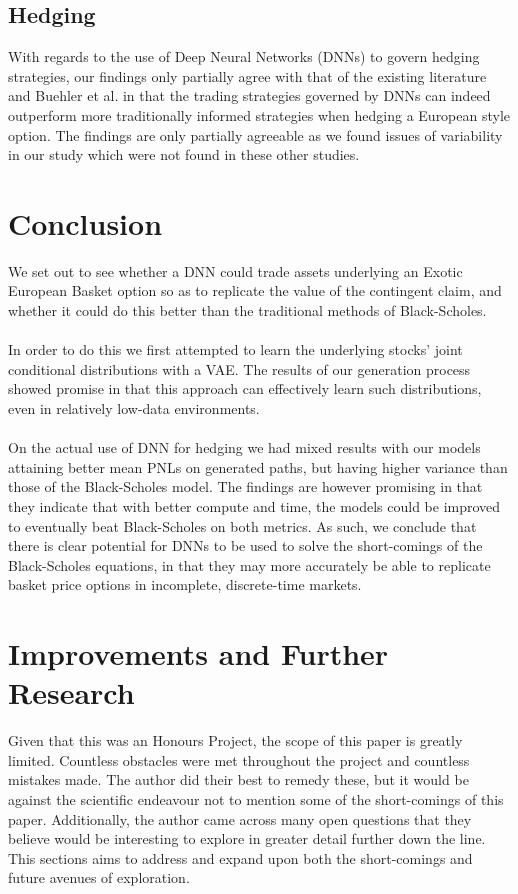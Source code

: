 \documentclass{article}
\theoremstyle{definition}
\begin{document}
\subsection{Hedging}
With regards to the use of Deep Neural Networks (DNNs) to govern hedging strategies, our findings only partially agree with that of the existing literature \cite{stangroom2023deephedging} and Buehler et al. \cite{buehler2019deep} in that the trading strategies governed by DNNs can indeed outperform more traditionally informed strategies when hedging a European style option. The findings are only partially agreeable as we found issues of variability in our study which were not found in these other studies.
\newpage

\section{Conclusion}
We set out to see whether a DNN could trade assets underlying an Exotic European Basket option so as to replicate the value of the contingent claim, and whether it could do this better than the traditional methods of Black-Scholes.\\\\
In order to do this we first attempted to learn the underlying stocks' joint conditional distributions with a VAE. The results of our generation process showed promise in that this approach can effectively learn such distributions, even in relatively low-data environments.
\\\\
On the actual use of DNN for hedging we had mixed results with our models attaining better mean PNLs on generated paths, but having higher variance than those of the Black-Scholes model. The findings are however promising in that they indicate that with better compute and time, the models could be improved to eventually beat Black-Scholes on both metrics. As such, we conclude that there is clear potential for DNNs to be used to solve the short-comings of the Black-Scholes equations, in that they may more accurately be able to replicate basket price options in incomplete, discrete-time markets. 
\newpage

\section{Improvements and Further Research}
Given that this was an Honours Project, the scope of this paper is greatly limited. Countless obstacles were met throughout the project and countless mistakes made. The author did their best to remedy these, but it would be against the scientific endeavour not to mention some of the short-comings of this paper. Additionally, the author came across many open questions that they believe would be interesting to explore in greater detail further down the line. This sections aims to address and expand upon both the short-comings and future avenues of exploration.
\end{document}
